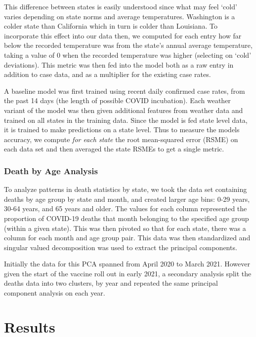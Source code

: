 \documentclass[11pt]{article}
\begin{document}
This difference between states is easily understood since what may feel `cold' varies depending on state norms and average temperatures. Washington is a colder state than California which in turn is colder than Louisiana. To incorporate this effect into our data then, we computed for each entry how far below the recorded temperature was from the state's annual average temperature, taking a value of 0 when the recorded temperature was higher (selecting on `cold' deviations). This metric was then fed into the model both as a raw entry in addition to case data, and as a multiplier for the existing case rates. 

A baseline model was first trained using recent daily confirmed case rates, from the past 14 days (the length of possible COVID incubation). 
Each weather variant of the model was then given additional features from weather data and trained on all states in the training data. Since the model is fed state level data, it is trained to make predictions on a state level. Thus to measure the models accuracy, we compute \textit{for each state} the root mean-squared error (RSME) on each data set and then averaged the state RSMEs to get a single metric. 

\subsubsection{Death by Age Analysis}

To analyze patterns in death statistics by state, we took the data set containing deaths by age group by state and month, and created larger age bins: 0-29 years, 30-64 years, and 65 years and older. The values for each column represented the proportion of COVID-19 deaths that month belonging to the specified age group (within a given state). This was then pivoted so that for each state, there was a column for each month and age group pair. This data was then standardized and singular valued decomposition was used to extract the principal components. 

Initially the data for this PCA spanned from April 2020 to March 2021. However given the start of the vaccine roll out in early 2021, a secondary analysis split the deaths data into two clusters, by year and repeated the same principal component analysis on each year. 


\newpage

\section{Results}
\end{document}
